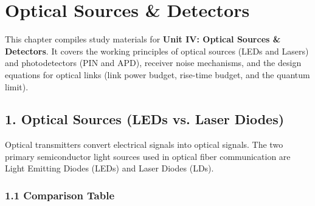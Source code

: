 \chapter{Optical Sources \& Detectors}

This chapter compiles study materials for \textbf{Unit IV: Optical Sources \& Detectors}. It covers the working principles of optical sources (LEDs and Lasers) and photodetectors (PIN and APD), receiver noise mechanisms, and the design equations for optical links (link power budget, rise-time budget, and the quantum limit).


\section{1. Optical Sources (LEDs vs. Laser Diodes)}

Optical transmitters convert electrical signals into optical signals. The two primary semiconductor light sources used in optical fiber communication are Light Emitting Diodes (LEDs) and Laser Diodes (LDs).

\subsection{1.1 Comparison Table}

